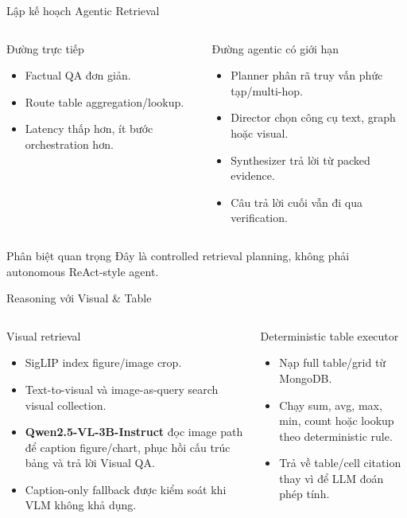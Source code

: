 \documentclass[aspectratio=169,11pt]{beamer}
\begin{document}
\begin{frame}{Lập kế hoạch Agentic Retrieval}
\small
\begin{columns}[T,onlytextwidth]
\begin{block}{Đường trực tiếp}
\begin{itemize}
  \item Factual QA đơn giản.
  \item Route table aggregation/lookup.
  \item Latency thấp hơn, ít bước orchestration hơn.
\end{itemize}
\end{block}
\begin{block}{Đường agentic có giới hạn}
\begin{itemize}
  \item Planner phân rã truy vấn phức tạp/multi-hop.
  \item Director chọn công cụ text, graph hoặc visual.
  \item Synthesizer trả lời từ packed evidence.
  \item Câu trả lời cuối vẫn đi qua verification.
\end{itemize}
\end{block}
\end{columns}
\vspace{0.15cm}
\begin{block}{Phân biệt quan trọng}
Đây là controlled retrieval planning, không phải autonomous ReAct-style agent.
\end{block}
\end{frame}

\begin{frame}{Reasoning với Visual \& Table}
\small
\begin{columns}[T,onlytextwidth]
\begin{block}{Visual retrieval}
\begin{itemize}
  \item SigLIP index figure/image crop.
  \item Text-to-visual và image-as-query search visual collection.
  \item \textbf{Qwen2.5-VL-3B-Instruct} đọc image path để caption figure/chart, phục hồi cấu trúc bảng và trả lời Visual QA.
  \item Caption-only fallback được kiểm soát khi VLM không khả dụng.
\end{itemize}
\end{block}
\begin{block}{Deterministic table executor}
\begin{itemize}
  \item Nạp full table/grid từ MongoDB.
  \item Chạy sum, avg, max, min, count hoặc lookup theo deterministic rule.
  \item Trả về table/cell citation thay vì để LLM đoán phép tính.
\end{itemize}
\end{block}
\end{columns}
\end{frame}
\end{document}
